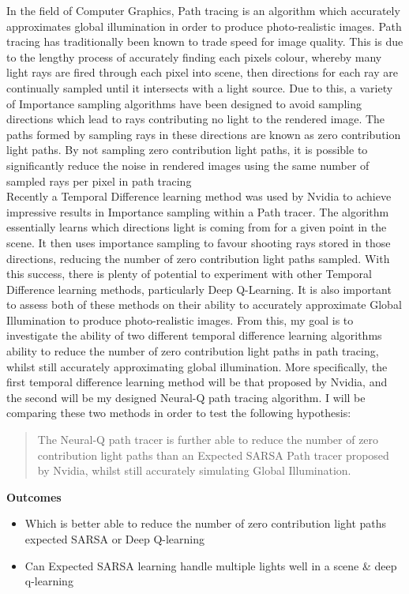 \documentclass[ %
                    author={Callum Pearce},
                supervisor={Dr. Neill Campbell},
                    degree={MEng},
                     title={How effective are Temporal difference learning methods for reducing the number of zero contribution light paths while still accurately approximating Global Illumination in Path tracing?},
                  subtitle={},
                      type={research},
                      year={2019} ]{dissertation}
\begin{document}
In the field of Computer Graphics, Path tracing is an algorithm which 
accurately approximates global illumination in order to produce 
photo-realistic images. Path tracing has traditionally been known to 
trade speed for image quality. This is due to the lengthy process of accurately 
finding each pixels colour, whereby many light rays are 
fired through each pixel into scene, then directions for each ray are 
continually sampled until it intersects with a light source. Due to 
this, a variety of Importance sampling algorithms have been designed 
to avoid sampling directions which lead to rays contributing no light 
to the rendered image. The paths formed by sampling rays in these 
directions are known as zero contribution light paths. By not sampling 
zero contribution light paths, it is possible to significantly reduce 
the noise in rendered images using the same number of sampled rays per 
pixel in path tracing\\

Recently a Temporal Difference learning method was used by Nvidia to
achieve impressive results in Importance sampling within a Path tracer.
The algorithm essentially learns which directions light is coming from for
a given point in the scene. It then uses importance sampling to favour shooting
rays stored in those directions, reducing the number of zero contribution light paths
sampled. With this success, there is plenty of potential to experiment with
other Temporal Difference learning methods, particularly Deep Q-Learning.
It is also important to assess both of these methods on their ability to 
accurately approximate Global Illumination to produce photo-realistic images.
From this, my goal is to investigate the ability of two different temporal
difference learning algorithms ability to reduce the number of zero contribution
light paths in path tracing, whilst still accurately approximating global illumination.
More specifically, the first temporal difference learning method will be that proposed
by Nvidia, and the second will be my designed Neural-Q path tracing algorithm.
I will be comparing these two methods in order to test the following hypothesis:

\begin{quote}
The Neural-Q  path tracer is further able to reduce
the number of zero contribution light paths than an Expected SARSA
Path tracer proposed by Nvidia, whilst still accurately simulating Global Illumination.
\end{quote}

\noindent
\textbf{Outcomes}
\begin{itemize}
\item Which is better able to reduce the number of zero contribution light paths expected SARSA or Deep Q-learning
\item Can Expected SARSA learning handle multiple lights well in a scene \& deep q-learning
\end{itemize}
\end{document}
